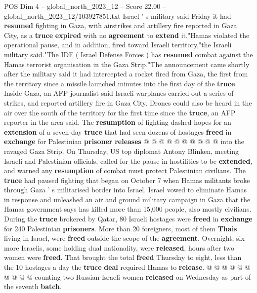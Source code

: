 \begin{textsample}{POS Dim 4 – global\_north\_2023\_12 – Score 22.00 – global\_north\_2023\_12/103927851.txt}  \label{ex:f4_pos_303}
Israel ' s military said Friday it had \textbf{resumed} fighting in Gaza, with airstrikes and artillery fire reported in Gaza City, as a \textbf{truce} \textbf{expired} with no \textbf{agreement} to \textbf{extend} it."Hamas violated the operational pause, and in addition, fired toward Israeli territory,"the Israeli military said."The IDF ( Israel Defense Forces ) has \textbf{resumed} combat against the Hamas terrorist organisation in the Gaza Strip."The announcement came shortly after the military said it had intercepted a rocket fired from Gaza, the first from the territory since a missile launched minutes into the first day of the \textbf{truce}.
Inside Gaza, an AFP journalist said Israeli warplanes carried out a series of strikes, and reported artillery fire in Gaza City.
Drones could also be heard in the air over the south of the territory for the first time since the \textbf{truce}, an AFP reporter in the area said.
The \textbf{resumption} of fighting dashed hopes for an \textbf{extension} of a seven-day \textbf{truce} that had seen dozens of hostages \textbf{freed} in \textbf{exchange} for Palestinian \textbf{prisoner} \textbf{releases} @ @ @ @ @ @ @ @ @ @ into the ravaged Gaza Strip.
On Thursday, US top diplomat Antony Blinken, meeting Israeli and Palestinian officials, called for the pause in hostilities to be \textbf{extended}, and warned any \textbf{resumption} of combat must protect Palestinian civilians.
The \textbf{truce} had paused fighting that began on October 7 when Hamas militants broke through Gaza ' s militarised border into Israel.
Israel vowed to eliminate Hamas in response and unleashed an air and ground military campaign in Gaza that the Hamas government says has killed more than 15,000 people, also mostly civilians.
During the \textbf{truce} brokered by Qatar, 80 Israeli hostages were \textbf{freed} in \textbf{exchange} for 240 Palestinian \textbf{prisoners}.
More than 20 foreigners, most of them \textbf{Thais} living in Israel, were \textbf{freed} outside the scope of the \textbf{agreement}.
Overnight, six more Israelis, some holding dual nationality, were \textbf{released}, hours after two women were \textbf{freed}.
That brought the total \textbf{freed} Thursday to eight, less than the 10 hostages a day the \textbf{truce} \textbf{deal} required Hamas to \textbf{release}. @ @ @ @ @ @ @ @ @ @ counting two Russian-Israeli women \textbf{released} on Wednesday as part of the seventh \textbf{batch}.

\end{textsample}
